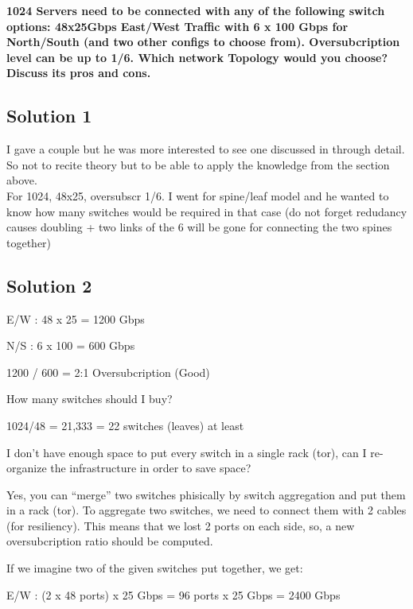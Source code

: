\textbf{1024 Servers need to be connected with any of the following
switch options: 48x25Gbps East/West Traffic with 6 x 100 Gbps for
North/South (and two other configs to choose from). Oversubcription
level can be up to 1/6. Which network Topology would you choose? Discuss
its pros and cons.}

\hypertarget{solution-1-1}{%
\subsection{Solution 1}\label{solution-1-1}}

I gave a couple but he was more interested to see one discussed in
through detail. So not to recite theory but to be able to apply the
knowledge from the section above.\\
For 1024, 48x25, oversubscr 1/6. I went for spine/leaf model and he
wanted to know how many switches would be required in that case (do not
forget redudancy causes doubling + two links of the 6 will be gone for
connecting the two spines together)

\hypertarget{solution-2-2}{%
\subsection{Solution 2}\label{solution-2-2}}

E/W : 48 x 25 = 1200 Gbps

N/S : 6 x 100 = 600 Gbps

1200 / 600 = 2:1 Oversubcription (Good) 

How many switches should I buy?

1024/48 = 21,333 = 22 switches (leaves) at least 

I don't have enough space to put every switch in a single rack (tor),
can I re-organize the infrastructure in order to save space?

Yes, you can ``merge'' two switches phisically by switch aggregation and
put them in a rack (tor). To aggregate two switches, we need to connect
them with 2 cables (for resiliency). This means that we lost 2 ports on
each side, so, a new oversubcription ratio should be computed.

If we imagine two of the given switches put together, we get:

E/W : (2 x 48 ports) x 25 Gbps = 96 ports x 25 Gbps = 2400 Gbps

